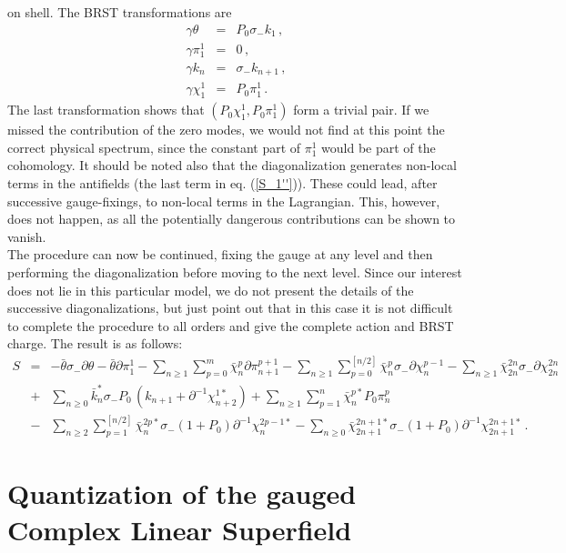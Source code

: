 \documentclass[a4paper,12pt]{article}
\begin{document}
on shell. The BRST transformations are
\begin{eqnarray*}
  \gamma \theta & = & P_0 \sigma_- k_1 \, , \\
  \gamma \pi_1^1 & = & 0 \, , \\
  \gamma k_n & = & \sigma_- k_{n+1} \, , \\
  \gamma \chi_1^1 & = & P_0 \pi_1^1 \, .
\end{eqnarray*}
The last transformation shows that $(P_0 \chi_1^1, P_0 \pi_1^1)$ form
a trivial pair. If we missed the contribution of the zero modes, we
would not find at this point the correct physical spectrum, since the
constant part of $\pi_1^1$ would be part of the cohomology.  It should
be noted also that the diagonalization generates non-local terms in
the antifields (the last term in eq. (\ref{S_1''})). These could lead,
after successive gauge-fixings, to non-local terms in the Lagrangian.
This, however, does not happen, as all the potentially dangerous
contributions can be shown to
vanish. \\
The procedure can now be continued, fixing the gauge at any level and
then performing the diagonalization before moving to the next level.
Since our interest does not lie in this particular model, we do not
present the details of the successive diagonalizations, but just point
out that in this case it is not difficult to complete the procedure to
all orders and give the complete action and BRST charge. The result is
as follows:
\begin{eqnarray}
S & = & - \bar \theta \sigma_- \partial \theta - \bar\theta \partial
\pi_1^1 - \sum_{n\geq 1} \sum_{p=0}^m \bar\chi_n^p \partial \pi_{n+1}^{p+1} -
\sum_{n\geq 1} \sum_{p=0}^{[n/2]} \bar\chi_n^p \sigma_- \partial
\chi_n^{p-1} - \sum_{n\geq 1} \bar\chi_{2n}^{2n} \sigma_- \partial
\chi_{2n}^{2n} \nonumber \\
& + & \sum_{n\geq0} \bar k_n^*  \sigma_- P_0 \, (k_{n+1} +
\partial^{-1} \chi_{n+2}^{1*}) + \sum_{n\geq1} \sum_{p=1}^n
\bar\chi_n^{p*} P_0 \pi_n^p \nonumber \\
& - & \sum_{n\geq2} \sum_{p=1}^{[n/2]} \bar\chi_n^{2p*} \sigma_- (1+P_0)
\partial^{-1} \chi_n^{2p-1*} 
- \sum_{n\geq0} \bar\chi_{2n+1}^{2n+1*} \sigma_- (1+P_0)
\partial^{-1} \chi_{2n+1}^{2n+1*}    \, .
\end{eqnarray}


\section{Quantization of the gauged Complex Linear Superfield}
\label{gauged}
\end{document}
